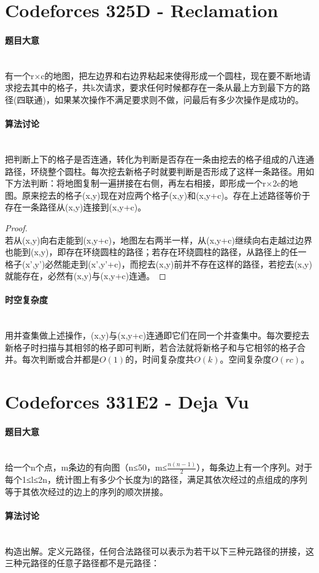 \documentclass[UTF8]{ctexart}
\newcommand{\myparagraph}[1]{\paragraph{#1}\mbox{}\\}
\theoremstyle{nonumberplain}
\newtheorem{proof}{\hspace{1em}证明：}
\begin{document}
	\section{Codeforces 325D - Reclamation}
		
		\myparagraph{题目大意}
		
			有一个r×c的地图，把左边界和右边界粘起来使得形成一个圆柱，现在要不断地请求挖去其中的格子，共k次请求，要求任何时候都存在一条从最上方到最下方的路径(四联通)，如果某次操作不满足要求则不做，问最后有多少次操作是成功的。
		
		\myparagraph{算法讨论}
		
			把判断上下的格子是否连通，转化为判断是否存在一条由挖去的格子组成的八连通路径，环绕整个圆柱。每次挖去新格子时就要判断是否形成了这样一条路径。用如下方法判断：将地图复制一遍拼接在右侧，再左右相接，即形成一个r×2c的地图。原来挖去的格子(x,y)现在对应两个格子(x,y)和(x,y+c)。存在上述路径等价于存在一条路径从(x,y)连接到(x,y+c)。
			
			\begin{proof}\mbox{}\\
			
				若从(x,y)向右走能到(x,y+c)，地图左右两半一样，从(x,y+c)继续向右走越过边界也能到(x,y)，即存在环绕圆柱的路径；若存在环绕圆柱的路径，从路径上的任一格子(x',y')必然能走到(x',y'+c)，而挖去(x,y)前并不存在这样的路径，若挖去(x,y)就能存在，必然有(x,y)与(x,y+c)连通。
			
			\end{proof}
		
		\myparagraph{时空复杂度}
		
			用并查集做上述操作，(x,y)与(x,y+c)连通即它们在同一个并查集中。每次要挖去新格子时扫描与其相邻的格子即可判断，若合法就将新格子和与它相邻的格子合并。每次判断或合并都是$O(1)$的，时间复杂度共$O(k)$。空间复杂度$O(rc)$。
	
	\section{Codeforces 331E2 - Deja Vu}
		
		\myparagraph{题目大意}
		
			给一个n个点，m条边的有向图（n≤50，m≤$\frac{n(n-1)}{2}$），每条边上有一个序列。对于每个1≤l≤2n，统计图上有多少个长度为l的路径，满足其依次经过的点组成的序列等于其依次经过的边上的序列的顺次拼接。
			
		\myparagraph{算法讨论}
		
			构造出解。定义元路径，任何合法路径可以表示为若干以下三种元路径的拼接，这三种元路径的任意子路径都不是元路径：
			
\end{document}
